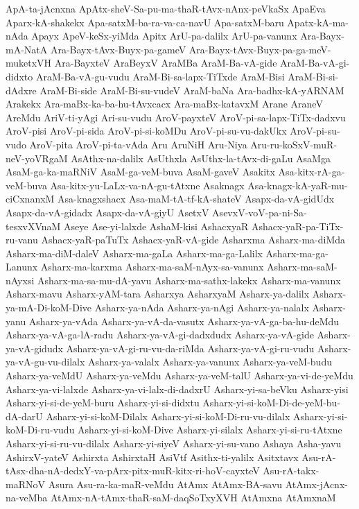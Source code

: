 {ApA-ta-jAcnxna
ApAtx-sheV-Sa-pu-ma-thaR-tAvx-nAnx-peVkaSx
ApaEva
Aparx-kA-shakekx
Apa-satxM-ba-ra-va-ca-navU
Apa-satxM-baru
Apatx-kA-ma-nAda
Apayx
ApeV-keSx-yiMda
Apitx
ArU-pa-dalilx
ArU-pa-vanunx
Ara-Bayx-mA-NatA
Ara-Bayx-tAvx-Buyx-pa-gameV
Ara-Bayx-tAvx-Buyx-pa-ga-meV-muketxVH
Ara-BayxteV
AraBeyxV
AraMBa
AraM-Ba-vA-gide
AraM-Ba-vA-gi-didxto
AraM-Ba-vA-gu-vudu
AraM-Bi-sa-lapx-TiTxde
AraM-Bisi
AraM-Bi-si-dAdxre
AraM-Bi-side
AraM-Bi-su-vudeV
AraM-baNa
Ara-badhx-kA-yARNAM
Arakekx
Ara-maBx-ka-ba-hu-tAvxcacx
Ara-maBx-katavxM
Arane
AraneV
AreMdu
AriV-ti-yAgi
Ari-su-vudu
AroV-payxteV
AroV-pi-sa-lapx-TiTx-dadxvu
AroV-pisi
AroV-pi-sida
AroV-pi-si-koMDu
AroV-pi-su-vu-dakUkx
AroV-pi-su-vudo
AroV-pita
AroV-pi-ta-vAda
Aru
AruNiH
Aru-Niya
Aru-ru-koSxV-muR-neV-yoVRgaM
AsAthx-na-dalilx
AsUthxla
AsUthx-la-tAvx-di-gaLu
AsaMga
AsaM-ga-ka-maRNiV
AsaM-ga-veM-buva
AsaM-gaveV
Asakitx
Asa-kitx-rA-ga-veM-buva
Asa-kitx-yu-LaLx-va-nA-gu-tAtxne
Asaknagx
Asa-knagx-kA-yaR-mu-ciCxnanxM
Asa-knagxshacx
Asa-maM-tA-tf-kA-shateV
Asapx-da-vA-gidUdx
Asapx-da-vA-gidadx
Asapx-da-vA-giyU
AsetxV
AsevxV-voV-pa-ni-Sa-tesxvXVnaM
Aseye
Ase-yi-lalxde
AshaM-kisi
AshacxyaR
Ashacx-yaR-pa-TiTx-ru-vanu
Ashacx-yaR-paTuTx
Ashacx-yaR-vA-gide
Asharxma
Asharx-ma-diMda
Asharx-ma-diM-daleV
Asharx-ma-gaLa
Asharx-ma-ga-Lalilx
Asharx-ma-ga-Lanunx
Asharx-ma-karxma
Asharx-ma-saM-nAyx-sa-vanunx
Asharx-ma-saM-nAyxsi
Asharx-ma-sa-mu-dA-yavu
Asharx-ma-sathx-lakekx
Asharx-ma-vanunx
Asharx-mavu
Asharx-yAM-tara
Asharxya
AsharxyaM
Asharx-ya-dalilx
Asharx-ya-mA-Di-koM-Dive
Asharx-ya-nAda
Asharx-ya-nAgi
Asharx-ya-nalalx
Asharx-yanu
Asharx-ya-vAda
Asharx-ya-vA-da-vasutx
Asharx-ya-vA-ga-ba-hu-deMdu
Asharx-ya-vA-ga-lA-radu
Asharx-ya-vA-gi-dadxdudx
Asharx-ya-vA-gide
Asharx-ya-vA-gidudx
Asharx-ya-vA-gi-ru-vu-da-riMda
Asharx-ya-vA-gi-ru-vudu
Asharx-ya-vA-gu-vu-dilalx
Asharx-ya-valalx
Asharx-ya-vanunx
Asharx-ya-veM-budu
Asharx-ya-veMdU
Asharx-ya-veMdu
Asharx-ya-veM-talU
Asharx-ya-vi-de-yeMdu
Asharx-ya-vi-lalxde
Asharx-ya-vi-lalx-di-dadxrU
Asharx-yi-sa-beVku
Asharx-yisi
Asharx-yi-si-de-yeM-buru
Asharx-yi-si-didxtu
Asharx-yi-si-koM-Di-de-yeM-bu-dA-darU
Asharx-yi-si-koM-Dilalx
Asharx-yi-si-koM-Di-ru-vu-dilalx
Asharx-yi-si-koM-Di-ru-vudu
Asharx-yi-si-koM-Dive
Asharx-yi-silalx
Asharx-yi-si-ru-tAtxne
Asharx-yi-si-ru-vu-dilalx
Asharx-yi-siyeV
Asharx-yi-su-vano
Ashaya
Asha-yavu
AshirxV-yateV
Ashirxta
AshirxtaH
AsiVtf
Asithx-ti-yalilx
Asitxtavx
Asu-rA-tAsx-dha-nA-dedxY-va-pArx-pitx-muR-kitx-ri-hoV-cayxteV
Asu-rA-takx-maRNoV
Asura
Asu-ra-ka-maR-veMdu
AtAmx
AtAmx-BA-savu
AtAmx-jAcnx-na-veMba
AtAmx-nA-tAmx-thaR-saM-daqSoTxyXVH
AtAmxna
AtAmxnaM
}

